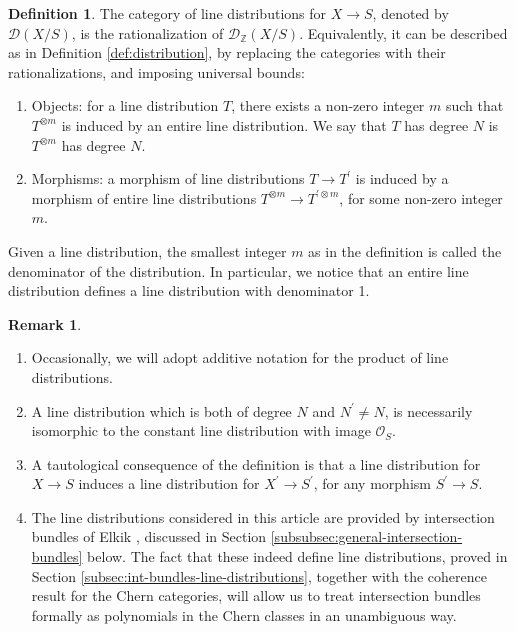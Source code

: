 \documentclass[JEP,XML,SOM,Unicode,published]{cedram}
\theoremstyle{plain}
\theoremstyle{definition}
\newtheorem{definition}[theorem]{Definition}
\newtheorem{remark}[theorem]{Remark}
\newcommand{\ZBbb}{\mathbb Z}
\newcommand{\Dcal}{\mathcal D}
\newcommand{\Ocal}{\mathcal O}
\begin{document}
\begin{definition}\label{def:Q-distribution}
The category of line distributions for $X\to S$, denoted by $\Dcal(X/S)$, is the rationalization of $\Dcal_{\ZBbb}(X/S)$. Equivalently, it can be described as in Definition \ref{def:distribution}, by replacing the categories with their rationalizations, and imposing universal bounds:
\begin{enumerate}
\item Objects: for a line distribution $T$, there exists a non-zero integer $m$ such that $T^{\otimes m}$ is induced by an entire line distribution. We say that $T$ has degree $N$ is $T^{\otimes m}$ has degree $N$.
\item Morphisms: a morphism of line distributions $T\to T^{\prime}$ is induced by a morphism of entire line distributions $T^{\otimes m}\to T^{\prime\otimes m} $, for some non-zero integer $m$.
\end{enumerate}
\end{definition}
Given a line distribution, the smallest integer $m$ as in the definition is called the denominator of the distribution. In particular, we notice that an entire line distribution defines a line distribution with denominator 1.\enlargethispage{.5\baselineskip}%

\skpt
\begin{remark}
\begin{enumerate}
\item Occasionally, we will adopt additive notation for the product of line distributions.
\item A line distribution which is both of degree $N$ and $N^{\prime}\neq N$, is necessarily isomorphic to the constant line distribution with image $\Ocal_{S}$.
\item A tautological consequence of the definition is that a line distribution for \hbox{$X\!\to\! S$} induces a line distribution for $X^{\prime}\to S^{\prime}$, for any morphism $S^{\prime}\to S$.
\item The line distributions considered in this article are provided by intersection bundles of Elkik \cite{Elkikfib}, discussed in Section \ref{subsubsec:general-intersection-bundles} below. The fact that these indeed define line distributions, proved in Section \ref{subsec:int-bundles-line-distributions}, together with the coherence result for the Chern categories, will allow us to treat intersection bundles formally as polynomials in the Chern classes in an unambiguous way.
\end{enumerate}
\end{remark}
\end{document}

